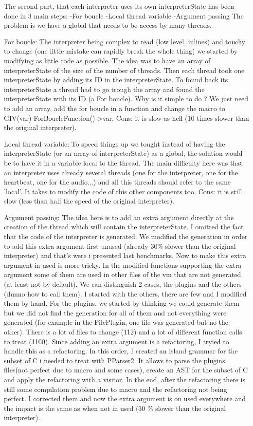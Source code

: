 \documentclass[11pt]{article} %
\begin{document}
The second part, that each interpreter uses its own interpreterState has been done in 3 main steps:
-For boucle
-Local thread variable
-Argument passing
The problem is we have a global that needs to be access by many threads.

For boucle: The interpreter being complex to read (low level, inlines) and touchy to change (one little mistake can rapidly break the whole thing) we started by modifying as little code as possible.
The idea was to have an array of interpreterState of the size of the number of threads. Then each thread took one interpreterState by adding its ID in the interpreterState. To found back its interpreterState a thread had to go trough the array and found the interpreterState with its ID (a For boucle).
Why is it simple to do ? We just need to add an array, add the for boucle in a function and change the macro to GIV(var) ForBoucleFunction()->var.
Cons: it is slow as hell (10 times slower than the original interpreter).

Local thread variable: To speed things up we tought instead of having the interpreterState (or an array of interpreterState) as a global, the solution would be to have it in a variable local to the thread.
The main difficulty here was  that an interpreter uses already several threads (one for the interpreter, one for the heartbeat, one for the audio...) and all this threads should refer to the same 'local'.
It takes to modify the code of this other components too.
Cons: it is still slow (less than half the speed of the original interpreter).

Argument passing: The idea here is to add an extra argument directly at the creation of the thread which will contain the interpreterState. I omitted the fact that the code of the interpreter is generated. We modified the generation in order to add this extra argument first unused (already 30\% slower than the original interpreter) and that's were i presented last benchmarks.
Now to make this extra argument in used is more tricky. In the modified functions supporting the extra argument some of them are used in other files of the vm that are not generated (at least not by default). We can distinguish 2 cases, the plugins and the others (dunno how to call them). I started with the others, there are few and I modified them by hand. For the plugins, we started by thinking we could generate them but we did not find the generation for all of them and not everything were generated (for example in the FilePlugin, one file was generated but no the other). There is a lot of files to change (112) and a lot of different function calls to treat (1100). Since adding an extra argument is a refactoring, I tryied to handle this as a refactoring. In this order, I created an island grammar for the subset of C i needed to treat with PParser2. It allows to parse the plugins files(not perfect due to macro and some cases), create an AST for the subset of C and apply the refactoring with a visitor. In the end, after the refactoring there is still some compilation problem due to macro and the refactoring not being perfect. I corrected them and now the extra argument is on used everywhere and the impact is the same as when not in used (30 \% slower than the original interpreter).
\end{document}
